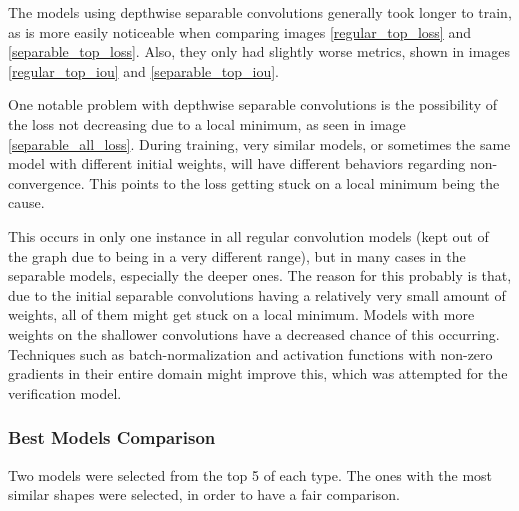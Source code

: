\documentclass[runningheads]{llncs}
\begin{document}
The models using depthwise separable convolutions generally took longer to train, as is more easily noticeable when comparing images \ref{regular_top_loss} and \ref{separable_top_loss}. Also, they only had slightly worse metrics, shown in images \ref{regular_top_iou} and \ref{separable_top_iou}.

One notable problem with depthwise separable convolutions is the possibility of the loss not decreasing due to a local minimum, as seen in image \ref{separable_all_loss}. During training, very similar models, or sometimes the same model with different initial weights, will have different behaviors regarding non-convergence. This points to the loss getting stuck on a local minimum being the cause.

This occurs in only one instance in all regular convolution models (kept out of the graph due to being in a very different range), but in many cases in the separable models, especially the deeper ones. The reason for this probably is that, due to the initial separable convolutions having a relatively very small amount of weights, all of them might get stuck on a local minimum. Models with more weights on the shallower convolutions have a decreased chance of this occurring. Techniques such as batch-normalization\cite{ioffe2015batch} and activation functions with non-zero gradients in their entire domain might improve this, which was attempted for the verification model.

\subsubsection{Best Models Comparison} \hfill 

Two models were selected from the top 5 of each type. The ones with the most similar shapes were selected, in order to have a fair comparison.
\end{document}
